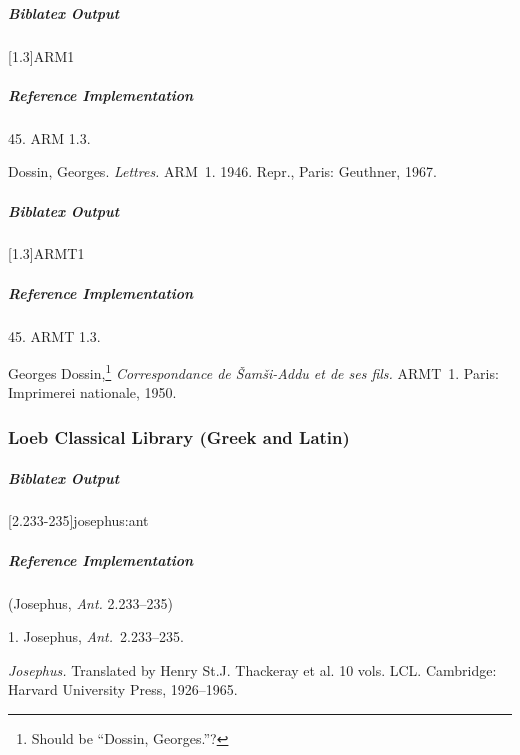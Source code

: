 \documentclass[a4paper]{article}
\newenvironment{biboutput}{%
  \subparagraph{Biblatex Output}
}{\color{black}}
\newenvironment{refimp}{%
  \subparagraph{Reference Implementation}
  \color{reference-colour}
  \rm
}{\par\color{black}}
\begin{document}
\begin{biboutput}
  [1.3]{ARM1}
\end{biboutput}

\begin{refimp}
  \hspace*{\bibindent}45. ARM 1.3.

  \hangindent\bibindent Dossin, Georges. \emph{Lettres.} ARM~1. 1946. Repr.,
  Paris: Geuthner, 1967.

\end{refimp}

\begin{biboutput}
  [1.3]{ARMT1}
\end{biboutput}

\begin{refimp}
  \hspace*{\bibindent}45. ARMT 1.3.

  \hangindent\bibindent Georges Dossin,\footnote{Should be “Dossin,
  Georges.”?} \emph{Correspondance de Šamši-Addu et de ses fils.} ARMT~1.
  Paris: Imprimerei nationale, 1950.

\end{refimp}

\subsubsection{Loeb Classical Library (Greek and Latin)}

\begin{biboutput}
  [2.233-235]{josephus:ant}
\end{biboutput}

\begin{refimp}
  (Josephus, \emph{Ant.} 2.233–235)

  \hspace*{\bibindent}1. Josephus, \emph{Ant.}\ 2.233–235.

  \hangindent\bibindent \emph{Josephus.} Translated by Henry St.\@ J.
  Thackeray et al. 10 vols. LCL. Cambridge: Harvard University Press,
  1926–1965.

\end{refimp}
\end{document}
